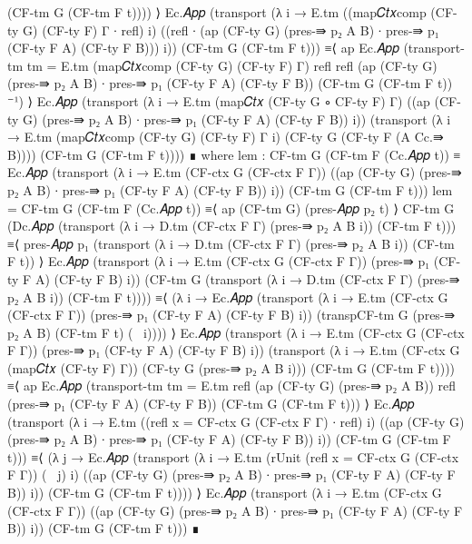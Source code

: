\begin{code}[hide]
        (CF-tm G (CF-tm F t)))) ⟩
    Ec.𝐴𝑝𝑝 (transport (λ i → E.tm
      ((map𝐶𝑡𝑥comp (CF-ty G) (CF-ty F) Γ ∙ refl) i)
      ((refl ∙ (ap (CF-ty G) (pres-⇛ p₂ A B) ∙ pres-⇛ p₁ (CF-ty F A) (CF-ty F B))) i))
      (CF-tm G (CF-tm F t)))
      ≡⟨ ap Ec.𝐴𝑝𝑝 (transport-tm {tm = E.tm} (map𝐶𝑡𝑥comp (CF-ty G) (CF-ty F) Γ) refl
        refl (ap (CF-ty G) (pres-⇛ p₂ A B) ∙ pres-⇛ p₁ (CF-ty F A) (CF-ty F B))
        (CF-tm G (CF-tm F t)) ⁻¹) ⟩
    Ec.𝐴𝑝𝑝 (transport (λ i → E.tm (map𝐶𝑡𝑥 (CF-ty G ∘ CF-ty F) Γ)
      ((ap (CF-ty G) (pres-⇛ p₂ A B) ∙ pres-⇛ p₁ (CF-ty F A) (CF-ty F B)) i))
      (transport (λ i → E.tm (map𝐶𝑡𝑥comp (CF-ty G) (CF-ty F) Γ i) (CF-ty G (CF-ty F (A Cc.⇛ B))))
        (CF-tm G (CF-tm F t))))
      ∎ where
    lem : CF-tm G (CF-tm F (Cc.𝐴𝑝𝑝 t))
      ≡ Ec.𝐴𝑝𝑝 (transport (λ i → E.tm (CF-ctx G (CF-ctx F Γ)) ((ap (CF-ty G) (pres-⇛ p₂ A B)
        ∙ pres-⇛ p₁ (CF-ty F A) (CF-ty F B)) i)) (CF-tm G (CF-tm F t)))
    lem =
      CF-tm G (CF-tm F (Cc.𝐴𝑝𝑝 t))
        ≡⟨ ap (CF-tm G) (pres-𝐴𝑝𝑝 p₂ t) ⟩
      CF-tm G (Dc.𝐴𝑝𝑝 (transport (λ i → D.tm (CF-ctx F Γ) (pres-⇛ p₂ A B i)) (CF-tm F t)))
        ≡⟨ pres-𝐴𝑝𝑝 p₁ (transport (λ i → D.tm (CF-ctx F Γ) (pres-⇛ p₂ A B i)) (CF-tm F t)) ⟩
      Ec.𝐴𝑝𝑝 (transport (λ i → E.tm (CF-ctx G (CF-ctx F Γ)) (pres-⇛ p₁ (CF-ty F A) (CF-ty F B) i))
        (CF-tm G (transport (λ i → D.tm (CF-ctx F Γ) (pres-⇛ p₂ A B i)) (CF-tm F t))))
        ≡⟨ (λ i → Ec.𝐴𝑝𝑝 (transport (λ i → E.tm (CF-ctx G (CF-ctx F Γ)) (pres-⇛ p₁ (CF-ty F A)
          (CF-ty F B) i)) (transpCF-tm G (pres-⇛ p₂ A B) (CF-tm F t) (~ i)))) ⟩
      Ec.𝐴𝑝𝑝 (transport (λ i → E.tm (CF-ctx G (CF-ctx F Γ)) (pres-⇛ p₁ (CF-ty F A) (CF-ty F B) i))
        (transport (λ i → E.tm (CF-ctx G (map𝐶𝑡𝑥 (CF-ty F) Γ)) (CF-ty G (pres-⇛ p₂ A B i)))
          (CF-tm G (CF-tm F t))))
        ≡⟨ ap Ec.𝐴𝑝𝑝 (transport-tm {tm = E.tm} refl (ap (CF-ty G) (pres-⇛ p₂ A B))
          refl (pres-⇛ p₁ (CF-ty F A) (CF-ty F B)) (CF-tm G (CF-tm F t))) ⟩
      Ec.𝐴𝑝𝑝 (transport (λ i → E.tm ((refl {x = CF-ctx G (CF-ctx F Γ)} ∙ refl) i)
        ((ap (CF-ty G) (pres-⇛ p₂ A B) ∙ pres-⇛ p₁ (CF-ty F A) (CF-ty F B)) i))
        (CF-tm G (CF-tm F t)))
        ≡⟨ (λ j → Ec.𝐴𝑝𝑝 (transport (λ i → E.tm (rUnit (refl {x = CF-ctx G (CF-ctx F Γ)}) (~ j) i)
          ((ap (CF-ty G) (pres-⇛ p₂ A B) ∙ pres-⇛ p₁ (CF-ty F A) (CF-ty F B)) i))
          (CF-tm G (CF-tm F t)))) ⟩
      Ec.𝐴𝑝𝑝 (transport (λ i → E.tm (CF-ctx G (CF-ctx F Γ)) ((ap (CF-ty G) (pres-⇛ p₂ A B)
        ∙ pres-⇛ p₁ (CF-ty F A) (CF-ty F B)) i)) (CF-tm G (CF-tm F t)))
        ∎
\end{code}
